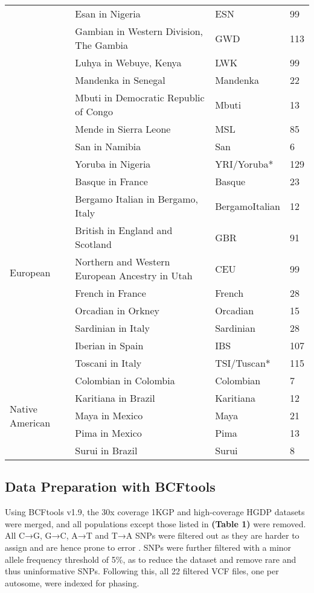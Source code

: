 \documentclass[11pt]{article}
\begin{document}
\begin{table}[htb]
\begin{tabular}{ |p{3cm}||p{8cm}|p{3cm}|p{0.8cm}|  }
        &Esan in Nigeria & ESN & 99 \\
        &Gambian in Western Division, The Gambia & GWD & 113 \\
        &Luhya in Webuye, Kenya & LWK & 99 \\
        &Mandenka in Senegal & Mandenka & 22 \\
        &Mbuti in Democratic Republic of Congo & Mbuti & 13 \\
        &Mende in Sierra Leone & MSL & 85 \\
        &San in Namibia & San & 6 \\
        &Yoruba in Nigeria & YRI/Yoruba* & 129 \\
    \hline
    \multirow{9}{*}{European}
        &Basque in France & Basque & 23 \\
        &Bergamo Italian in Bergamo, Italy & BergamoItalian & 12 \\
        &British in England and Scotland & GBR & 91 \\
        &Northern and Western European Ancestry in Utah & CEU & 99 \\
        &French in France & French & 28 \\
        &Orcadian in Orkney & Orcadian & 15 \\
        &Sardinian in Italy & Sardinian & 28 \\
        &Iberian in Spain & IBS & 107 \\
        &Toscani in Italy & TSI/Tuscan* & 115 \\
    \hline
    \multirow{5}{*}{Native American}
        &Colombian in Colombia & Colombian & 7 \\
        &Karitiana in Brazil & Karitiana & 12 \\
        &Maya in Mexico & Maya & 21 \\
        &Pima in Mexico & Pima & 13 \\
        &Surui in Brazil & Surui & 8 \\
    \hline
    \end{tabular}
\end{table}





\subsection{Data Preparation with BCFtools}

Using BCFtools v1.9, the 30x coverage 1KGP and high-coverage HGDP datasets were merged, and all populations except those listed in \textbf{(Table 1)} were removed. All C→G, G→C, A→T and T→A SNPs were filtered out as they are harder to assign and are hence prone to error \parencite{Danecek2021}. SNPs were further filtered with a minor allele frequency threshold of 5\%, as to reduce the dataset and remove rare and thus uninformative SNPs. Following this, all 22 filtered VCF files, one per autosome, were indexed for phasing. 
\end{document}
